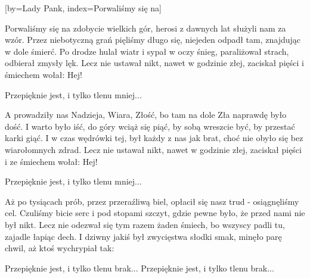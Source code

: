 [by={Lady Pank},
                     index={Porwaliśmy się na}]
\beginverse

Porwaliśmy się na zdobycie wielkich gór,
herosi z dawnych lat służyli nam za wzór.
Przez niebotyczną grań pięliśmy długo się,
niejeden odpadł tam, znajdując w dole śmierć.
Po drodze hulał wiatr i sypał w oczy śnieg,
paraliżował strach, odbierał zmysły lęk.
Lecz nie ustawał nikt, nawet w godzinie złej,
zaciskał pięści i śmiechem wołał: Hej!

\endverse
\beginverse

Przepięknie jest,
i tylko tlenu mniej...

\endverse
\beginverse

A prowadziły nas Nadzieja, Wiara, Złość,
bo tam na dole Zła naprawdę było dość.
I warto było iść, do góry wciąż się piąć,
by sobą wreszcie być, by przestać karki giąć.
I w czas wędrówki tej, był każdy z nas jak brat,
choć nie obyło się bez wiarołomnych zdrad.
Lecz nie ustawał nikt, nawet w godzinie złej,
zaciskał pięści i ze śmiechem wołał: Hej!

\endverse
\beginverse

Przepięknie jest,
i tylko tlenu mniej...

\endverse
\beginverse

Aż po tysiącach prób, przez przeraźliwą biel,
opłacił się nasz trud - osiągnęliśmy cel.
Czuliśmy bicie serc i pod stopami szczyt,
gdzie pewne było, że przed nami nie był nikt.
Lecz nie odezwał się tym razem żaden śmiech,
bo wszyscy padli tu, zajadle łapiąc dech.
I dziwny jakiś był zwycięstwa słodki smak,
minęło parę chwil, aż ktoś wychrypiał tak:

\endverse
\beginverse

Przepięknie jest,
i tylko tlenu brak...
Przepięknie jest,
i tylko tlenu brak...

\endverse
\endsong